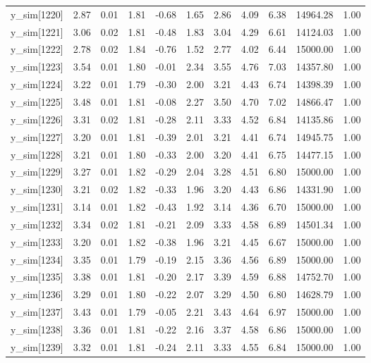 \begin{table}[ht]
\begin{tabular}{rrrrrrrrrrr}
  y\_sim[1220] & 2.87 & 0.01 & 1.81 & -0.68 & 1.65 & 2.86 & 4.09 & 6.38 & 14964.28 & 1.00 \\ 
  y\_sim[1221] & 3.06 & 0.02 & 1.81 & -0.48 & 1.83 & 3.04 & 4.29 & 6.61 & 14124.03 & 1.00 \\ 
  y\_sim[1222] & 2.78 & 0.02 & 1.84 & -0.76 & 1.52 & 2.77 & 4.02 & 6.44 & 15000.00 & 1.00 \\ 
  y\_sim[1223] & 3.54 & 0.01 & 1.80 & -0.01 & 2.34 & 3.55 & 4.76 & 7.03 & 14357.80 & 1.00 \\ 
  y\_sim[1224] & 3.22 & 0.01 & 1.79 & -0.30 & 2.00 & 3.21 & 4.43 & 6.74 & 14398.39 & 1.00 \\ 
  y\_sim[1225] & 3.48 & 0.01 & 1.81 & -0.08 & 2.27 & 3.50 & 4.70 & 7.02 & 14866.47 & 1.00 \\ 
  y\_sim[1226] & 3.31 & 0.02 & 1.81 & -0.28 & 2.11 & 3.33 & 4.52 & 6.84 & 14135.86 & 1.00 \\ 
  y\_sim[1227] & 3.20 & 0.01 & 1.81 & -0.39 & 2.01 & 3.21 & 4.41 & 6.74 & 14945.75 & 1.00 \\ 
  y\_sim[1228] & 3.21 & 0.01 & 1.80 & -0.33 & 2.00 & 3.20 & 4.41 & 6.75 & 14477.15 & 1.00 \\ 
  y\_sim[1229] & 3.27 & 0.01 & 1.82 & -0.29 & 2.04 & 3.28 & 4.51 & 6.80 & 15000.00 & 1.00 \\ 
  y\_sim[1230] & 3.21 & 0.02 & 1.82 & -0.33 & 1.96 & 3.20 & 4.43 & 6.86 & 14331.90 & 1.00 \\ 
  y\_sim[1231] & 3.14 & 0.01 & 1.82 & -0.43 & 1.92 & 3.14 & 4.36 & 6.70 & 15000.00 & 1.00 \\ 
  y\_sim[1232] & 3.34 & 0.02 & 1.81 & -0.21 & 2.09 & 3.33 & 4.58 & 6.89 & 14501.34 & 1.00 \\ 
  y\_sim[1233] & 3.20 & 0.01 & 1.82 & -0.38 & 1.96 & 3.21 & 4.45 & 6.67 & 15000.00 & 1.00 \\ 
  y\_sim[1234] & 3.35 & 0.01 & 1.79 & -0.19 & 2.15 & 3.36 & 4.56 & 6.89 & 15000.00 & 1.00 \\ 
  y\_sim[1235] & 3.38 & 0.01 & 1.81 & -0.20 & 2.17 & 3.39 & 4.59 & 6.88 & 14752.70 & 1.00 \\ 
  y\_sim[1236] & 3.29 & 0.01 & 1.80 & -0.22 & 2.07 & 3.29 & 4.50 & 6.80 & 14628.79 & 1.00 \\ 
  y\_sim[1237] & 3.43 & 0.01 & 1.79 & -0.05 & 2.21 & 3.43 & 4.64 & 6.97 & 15000.00 & 1.00 \\ 
  y\_sim[1238] & 3.36 & 0.01 & 1.81 & -0.22 & 2.16 & 3.37 & 4.58 & 6.86 & 15000.00 & 1.00 \\ 
  y\_sim[1239] & 3.32 & 0.01 & 1.81 & -0.24 & 2.11 & 3.33 & 4.55 & 6.84 & 15000.00 & 1.00 \\ 

\end{tabular}
\end{table}
